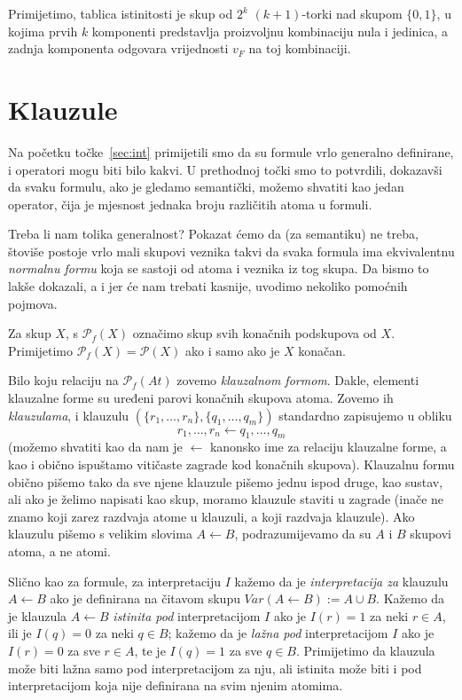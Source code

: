 Primijetimo, tablica istinitosti je skup od $2^k$ $(k+1)$-torki nad skupom $\{0,1\}$, u kojima prvih $k$ komponenti predstavlja proizvoljnu kombinaciju nula i jedinica, a zadnja komponenta odgovara vrijednosti $v_F$ na toj kombinaciji.

\section{Klauzule}

Na početku točke~\ref{sec:int} primijetili smo da su formule vrlo generalno definirane, i operatori mogu biti bilo kakvi. U prethodnoj točki smo to potvrdili, dokazavši da svaku formulu, ako je gledamo semantički, možemo shvatiti kao jedan operator, čija je mjesnost jednaka broju različitih atoma u formuli.

Treba li nam tolika generalnost? Pokazat ćemo da (za semantiku) ne treba, štoviše postoje vrlo mali skupovi veznika takvi da svaka formula ima ekvivalentnu \emph{normalnu formu} koja se sastoji od atoma i veznika iz tog skupa. Da bismo to lakše dokazali, a i jer će nam trebati kasnije, uvodimo nekoliko pomoćnih pojmova.

\begin{napomena}
Za skup $X$, s $\mathcal P_f(X)$ označimo skup svih konačnih podskupova od $X$. Primijetimo $\mathcal P_f(X)=\mathcal P(X)$ ako i samo ako je $X$ konačan.
\end{napomena}

\begin{definicija}
Bilo koju relaciju na $\mathcal P_f(At)$ zovemo \emph{klauzalnom formom}. Dakle, elementi klauzalne forme su uređeni parovi konačnih skupova atoma. Zovemo ih \emph{klauzulama}, i klauzulu $(\{r_1,\ldots,r_n\},\{q_1,\ldots,q_m\})$ standardno zapisujemo u obliku
$$r_1,\ldots,r_n\leftarrow q_1,\ldots,q_m$$
(možemo shvatiti kao da nam je $\leftarrow$ kanonsko ime za relaciju klauzalne forme, a kao i obično ispuštamo vitičaste zagrade kod konačnih skupova). Klauzalnu formu obično pišemo tako da sve njene klauzule pišemo jednu ispod druge, kao sustav, ali ako je želimo napisati kao skup, moramo klauzule staviti u zagrade (inače ne znamo koji zarez razdvaja atome u klauzuli, a koji razdvaja klauzule). Ako klauzulu pišemo s velikim slovima $A\leftarrow B$, podrazumijevamo da su $A$ i $B$ skupovi atoma, a ne atomi.

Slično kao za formule, za interpretaciju $I$ kažemo da je \emph{interpretacija za} klauzulu $A\leftarrow B$ ako je definirana na čitavom skupu $Var(A\leftarrow B):=A\cup B$. Kažemo da je klauzula $A\leftarrow B$ \emph{istinita pod} interpretacijom $I$ ako je $I(r)=1$ za neki $r\in A$, ili je $I(q)=0$ za neki $q\in B$; kažemo da je \emph{lažna pod} interpretacijom $I$ ako je $I(r)=0$ za sve $r\in A$, te je $I(q)=1$ za sve $q\in B$. Primijetimo da klauzula može biti lažna samo pod interpretacijom za nju, ali istinita može biti i pod interpretacijom koja nije definirana na svim njenim atomima.
\end{definicija}

